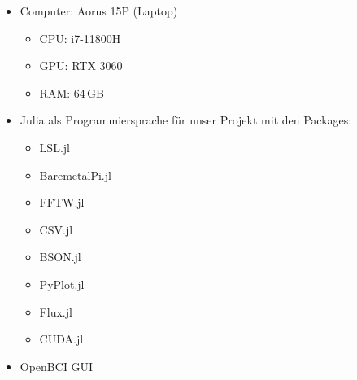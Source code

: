 \documentclass[10pt]{article}
\begin{document}
\begin{itemize}
\begin{multicols}{2}
\begin{itemize}
        \end{itemize}
        \end{multicols}
        \vspace*{-2ex}
    \item Computer: Aorus 15P (Laptop)
    \vspace*{-2ex}
    \begin{multicols}{3}
    \begin{itemize}
        \item CPU: i7-11800H
        \item GPU: RTX 3060
        \item RAM: 64\,GB
    \end{itemize}
    \end{multicols}
    \vspace*{-2ex}
    \item Julia als Programmiersprache für unser Projekt mit den Packages:
    \vspace*{-2ex}
    \begin{multicols}{4}
    \begin{itemize}
        \item LSL.jl
        \item BaremetalPi.jl
        \item FFTW.jl
        \item CSV.jl
        \item BSON.jl
        \item PyPlot.jl
        \item Flux.jl
        \item CUDA.jl
    \end{itemize}
    \end{multicols}
    \vspace*{-2ex}
    \item OpenBCI GUI
    

\end{itemize}
\end{document}
